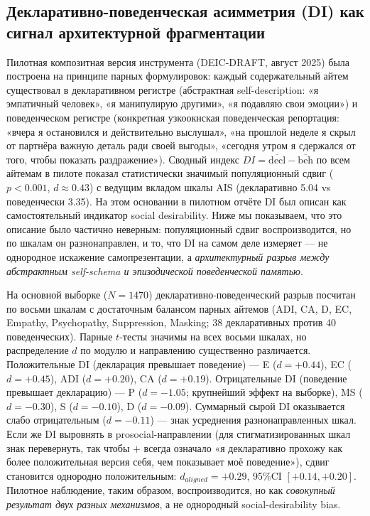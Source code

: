 \subsection{Декларативно-поведенческая асимметрия (DI) как сигнал архитектурной фрагментации}
\label{subsec:di_asymmetry}

Пилотная композитная версия инструмента (DEIC-DRAFT, август 2025) была построена на принципе парных формулировок: каждый содержательный айтем существовал в декларативном регистре (абстрактная self-description: «я эмпатичный человек», «я манипулирую другими», «я подавляю свои эмоции») и поведенческом регистре (конкретная узкоокнская поведенческая репортация: «вчера я остановился и действительно выслушал», «на прошлой неделе я скрыл от партнёра важную деталь ради своей выгоды», «сегодня утром я сдержался от того, чтобы показать раздражение»). Сводный индекс $DI = \overline{\text{decl}} - \overline{\text{beh}}$ по всем айтемам в пилоте показал статистически значимый популяционный сдвиг ($p < 0.001$, $d \approx 0.43$) с ведущим вкладом шкалы AIS (декларативно 5.04 vs поведенчески 3.35). На этом основании в пилотном отчёте DI был описан как самостоятельный индикатор social desirability. Ниже мы показываем, что это описание было частично неверным: популяционный сдвиг воспроизводится, но по шкалам он разнонаправлен, и то, что DI на самом деле измеряет --- не однородное искажение самопрезентации, а \emph{архитектурный разрыв между абстрактным self-schema и эпизодической поведенческой памятью}.

На основной выборке ($N{=}1470$) декларативно-поведенческий разрыв посчитан по восьми шкалам с достаточным балансом парных айтемов (ADI, CA, D, EC, Empathy, Psychopathy, Suppression, Masking; 38 декларативных против 40 поведенческих). Парные $t$-тесты значимы на всех восьми шкалах, но распределение $d$ по модулю и направлению существенно различается. Положительные DI (декларация превышает поведение) --- E ($d{=}{+}0.44$), EC ($d{=}{+}0.45$), ADI ($d{=}{+}0.20$), CA ($d{=}{+}0.19$). Отрицательные DI (поведение превышает декларацию) --- P ($d{=}{-}1.05$; крупнейший эффект на выборке), MS ($d{=}{-}0.30$), S ($d{=}{-}0.10$), D ($d{=}{-}0.09$). Суммарный сырой DI оказывается слабо отрицательным ($d{=}{-}0.11$) --- знак усреднения разнонаправленных шкал. Если же DI выровнять в prosocial-направлении (для стигматизированных шкал знак перевернуть, так чтобы $+$ всегда означало «я декларативно прохожу как более положительная версия себя, чем показывает моё поведение»), сдвиг становится однородно положительным: $d_{aligned}{=}{+}0.29$, 95\%CI $[{+}0.14, {+}0.20]$. Пилотное наблюдение, таким образом, воспроизводится, но как \emph{совокупный результат двух разных механизмов}, а не однородный social-desirability bias.

